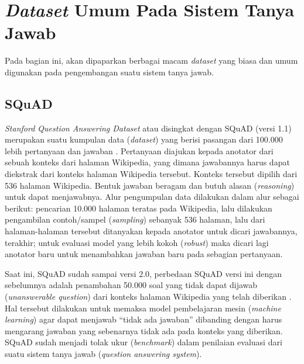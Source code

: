 \section{\emph{Dataset} Umum Pada Sistem Tanya Jawab}
Pada bagian ini, akan dipaparkan berbagai macam \emph{dataset} yang biasa dan umum digunakan pada pengembangan suatu sistem tanya jawab.

\subsection{SQuAD}
\emph{Stanford Question Answering Dataset} atau disingkat dengan SQuAD (versi 1.1) merupakan suatu kumpulan data (\emph{dataset}) yang berisi pasangan dari 100.000 lebih pertanyaan dan jawaban \citep{rajpurkar-etal-2016-squad}. Pertanyaan diajukan kepada anotator dari sebuah konteks dari halaman Wikipedia, yang dimana jawabannya harus dapat diekstrak dari konteks halaman Wikipedia tersebut. Konteks tersebut dipilih dari 536 halaman Wikipedia. Bentuk jawaban beragam dan butuh alasan (\emph{reasoning}) untuk dapat menjawabnya. Alur pengumpulan data dilakukan dalam alur sebagai berikut: pencarian 10.000 halaman teratas pada Wikipedia, lalu dilakukan pengambilan contoh/sampel (\emph{sampling}) sebanyak 536 halaman, lalu dari halaman-halaman tersebut ditanyakan kepada anotator untuk dicari jawabannya, terakhir; untuk evaluasi model yang lebih kokoh (\emph{robust}) maka dicari lagi anotator baru untuk menambahkan jawaban baru pada sebagian pertanyaan.

Saat ini, SQuAD sudah sampai versi 2.0, perbedaan SQuAD versi ini dengan sebelumnya adalah penambahan 50.000 soal yang tidak dapat dijawab (\emph{unanswerable question}) dari konteks halaman Wikipedia yang telah diberikan \citep{rajpurkar-etal-2018-know}. Hal tersebut dilakukan untuk memaksa model pembelajaran mesin (\emph{machine learning}) agar dapat menjawab “tidak ada jawaban” dibanding dengan harus mengarang jawaban yang sebenarnya tidak ada pada konteks yang diberikan. SQuAD sudah menjadi tolak ukur (\emph{benchmark}) dalam penilaian evaluasi dari suatu sistem tanya jawab (\emph{question answering system}).

